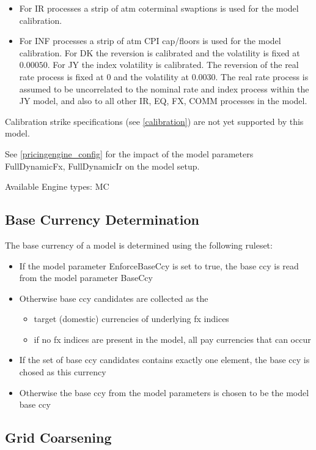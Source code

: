 \begin{itemize}
\item For IR processes a strip of atm coterminal swaptions is used for the model calibration.
\item For INF processes a strip of atm CPI cap/floors is used for the model calibration. For DK the reversion is
  calibrated and the volatility is fixed at $0.00050$. For JY the index volatility is calibrated. The reversion of the
  real rate process is fixed at $0$ and the volatility at $0.0030$. The real rate process is assumed to be uncorrelated
  to the nominal rate and index process within the JY model, and also to all other IR, EQ, FX, COMM processes in the
  model.
\end{itemize}

Calibration strike specifications (see \ref{calibration}) are not yet supported by this model.

See \ref{pricingengine_config} for the impact of the model parameters FullDynamicFx, FullDynamicIr on the model setup.

\smallskip
Available Engine types: MC

\subsection{Base Currency Determination}\label{baseccy_determination}

The base currency of a model is determined using the following ruleset:

\begin{itemize}
\item If the model parameter EnforceBaseCcy is set to true, the base ccy is read from the model parameter BaseCcy
\item Otherwise base ccy candidates are collected as the
  \begin{itemize}
    \item target (domestic) currencies of underlying fx indices
    \item if no fx indices are present in the model, all pay currencies that can occur
  \end{itemize}
\item If the set of base ccy candidates contains exactly one element, the base ccy is chosed as this currency
\item Otherwise the base ccy from the model parameters is chosen to be the model base ccy
\end{itemize}

\subsection{Grid Coarsening}\label{grid_coarsening}

